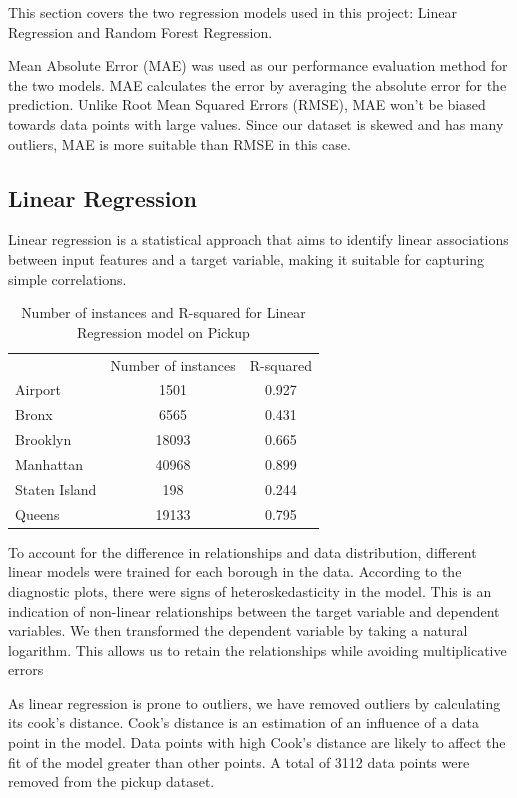 \documentclass[11pt]{article}
\begin{document}
This section covers the two regression models used in this project: Linear Regression and Random Forest Regression.

Mean Absolute Error (MAE) was used as our performance evaluation method for the two models. MAE calculates the error by averaging the absolute error for the prediction. Unlike Root Mean Squared Errors (RMSE), MAE won't be biased towards data points with large values. Since our dataset is skewed and has many outliers, MAE is more suitable than RMSE in this case.

\subsection{Linear Regression}

Linear regression is a statistical approach that aims to identify linear associations between input features and a target variable, making it suitable for capturing simple correlations. 

\begin{table}[]
\centering
\begin{tabular}{|l|c|c|}
              & Number of instances & R-squared \\
Airport       & 1501                & 0.927     \\
Bronx         & 6565                & 0.431     \\
Brooklyn      & 18093               & 0.665     \\
Manhattan     & 40968               & 0.899     \\
Staten Island & 198                 & 0.244     \\
Queens        & 19133               & 0.795    

\end{tabular}
\caption{Number of instances and R-squared for Linear Regression model on Pickup}
\label{tab:lr_result}
\end{table}

To account for the difference in relationships and data distribution, different linear models were trained for each borough in the data. According to the diagnostic plots, there were signs of heteroskedasticity in the model. This is an indication of non-linear relationships between the target variable and dependent variables. We then transformed the dependent variable by taking a natural logarithm. This allows us to retain the relationships while avoiding multiplicative errors \cite{mast30025}

As linear regression is prone to outliers, we have removed outliers by calculating its cook's distance. Cook's distance is an estimation of an influence of a data point in the model. Data points with high Cook's distance are likely to affect the fit of the model greater than other points. A total of 3112 data points were removed from the pickup dataset.
\end{document}
